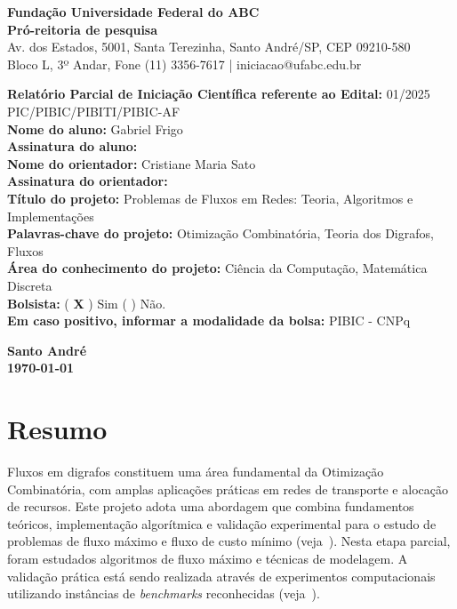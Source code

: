 \documentclass[12pt,a4paper]{article}
\begin{document}
\onehalfspacing

\begin{center}
    \textbf{Fundação Universidade Federal do ABC}\\
    \textbf{Pró-reitoria de pesquisa}\\
    \small Av. dos Estados, 5001, Santa Terezinha, Santo André/SP, CEP 09210-580\\
    Bloco L, 3º Andar, Fone (11) 3356-7617 | iniciacao@ufabc.edu.br
\end{center}

\vspace{0.8cm}

\noindent \textbf{Relatório Parcial de Iniciação Científica referente ao Edital:} 01/2025 PIC\slash PIBIC\slash PIBITI\slash PIBIC-AF \\[0.5cm]
\noindent \textbf{Nome do aluno:} Gabriel Frigo \\[0.5cm]
\noindent \textbf{Assinatura do aluno:} \hrulefill \\[0.5cm]
\noindent \textbf{Nome do orientador:} Cristiane Maria Sato \\[0.5cm]
\noindent \textbf{Assinatura do orientador:} \hrulefill \\[0.5cm]
\noindent \textbf{Título do projeto:} Problemas de Fluxos em Redes: Teoria, Algoritmos e Implementações \\[0.5cm]
\noindent \textbf{Palavras-chave do projeto:} Otimização Combinatória, Teoria dos Digrafos, Fluxos \\[0.5cm]
\noindent \textbf{Área do conhecimento do projeto:} Ciência da Computação, Matemática Discreta \\[0.5cm]
\noindent \textbf{Bolsista:} ( \textbf{\textsf{X}} ) Sim \quad ( \quad ) Não. \\
\textbf{Em caso positivo, informar a modalidade da bolsa:} PIBIC - CNPq \\[1cm]

\begin{center}
    \textbf{Santo André}\\
    \textbf{\today}
\end{center}

\newpage
\renewcommand{\contentsname}{Sumário}
\tableofcontents
\newpage

\section{Resumo}
Fluxos em digrafos constituem uma área fundamental da Otimização Combinatória, com amplas aplicações práticas em redes de transporte e alocação de recursos. Este projeto adota uma abordagem que combina fundamentos teóricos, implementação algorítmica e validação experimental para o estudo de problemas de fluxo máximo e fluxo de custo mínimo (veja~\cite{ahuja1993network}). Nesta etapa parcial, foram estudados algoritmos de fluxo máximo e técnicas de modelagem. A validação prática está sendo realizada através de experimentos computacionais utilizando instâncias de \textit{benchmarks} reconhecidas (veja~\cite{Jensen2022}).
\end{document}
